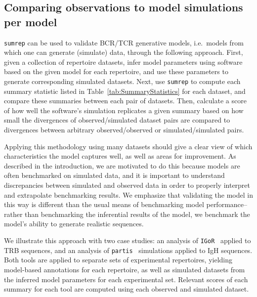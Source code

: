\documentclass{article}
\newcommand{\partis}{\texttt{partis}}
\newcommand{\igor}{\texttt{IGoR}}
\begin{document}
\subsection*{Comparing observations to model simulations per model}
\texttt{sumrep} can be used to validate BCR/TCR generative models, i.e.\ models from which one can generate (simulate) data, through the following approach.
First, given a collection of repertoire datasets, infer model parameters using software based on the given model for each repertoire, and use these parameters to generate corresponding simulated datasets.
Next, use \texttt{sumrep} to compute each summary statistic listed in Table~\ref{tab:SummaryStatistics} for each dataset, and compare these summaries between each pair of datasets.
Then, calculate a score of how well the software's simulation replicates a given summary based on how small the divergences of observed/simulated dataset pairs are compared to divergences between arbitrary observed/observed or simulated/simulated pairs.

Applying this methodology using many datasets should give a clear view of which characteristics the model captures well, as well as areas for improvement.
As described in the introduction, we are motivated to do this because models are often benchmarked on simulated data, and it is important to understand discrepancies between simulated and observed data in order to properly interpret and extrapolate benchmarking results.
We emphasize that validating the model in this way is different than the usual means of benchmarking model performance-- rather than benchmarking the inferential results of the model, we benchmark the model's ability to generate realistic sequences.

We illustrate this approach with two case studies:
an analysis of \igor~\cite{Marcou2018-du} applied to TRB sequences, and an analysis of \partis~\cite{Ralph2016-nw, Ralph2016-iz} simulations applied to IgH sequences.
Both tools are applied to separate sets of experimental repertoires, yielding model-based annotations for each repertoire, as well as simulated datasets from the inferred model parameters for each experimental set.
Relevant scores of each summary for each tool are computed using each observed and simulated dataset.

\end{document}
